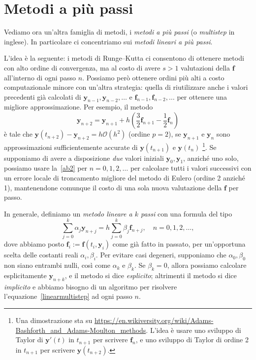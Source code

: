 \documentclass[a4paper]{report}
\theoremstyle{definiton}
\theoremstyle{remark}
\newcommand{\y}{\mathbf{y}}
\newcommand{\f}{\mathbf{f}}
\begin{document}
\section{Metodi a più passi}

Vediamo ora un'altra famiglia di metodi, i \emph{metodi a più passi} (o \emph{multistep} in inglese). In particolare ci concentriamo sui \emph{metodi lineari a più passi}.

L'idea è la seguente: i metodi di Runge--Kutta ci consentono di ottenere metodi con alto ordine di convergenza, ma al costo di avere $s>1$ valutazioni della $\mathbf{f}$ all'interno di ogni passo $n$. Possiamo però ottenere ordini più alti a costo computazionale minore con un'altra strategia: quella di riutilizzare anche i valori precedenti già calcolati di $\y_{n-1}, \y_{n-2}, \dots$ e $\f_{n-1},\f_{n-2},\dots$ per ottenere una migliore approssimazione. Per esempio, il metodo
\begin{equation} \label{ab2}
    \y_{n+2} = \y_{n+1} + h\left(\frac32 \f_{n+1} - \frac12 \f_n\right)    
\end{equation}
è tale che $\y(t_{n+2}) - \y_{n+2} = h\mathcal{O}(h^2)$ (ordine $p=2$), se $\y_{n+1}$ e $\y_n$ sono approssimazioni sufficientemente accurate di $\y(t_{n+1})$ e $\y(t_n)$ \footnote{Una dimostrazione sta su \url{https://en.wikiversity.org/wiki/Adams-Bashforth_and_Adams-Moulton_methods}. L'idea è usare uno sviluppo di Taylor di $\y'(t)$ in $t_{n+1}$ per scrivere $\f_n$, e uno sviluppo di Taylor di ordine 2 in $t_{n+1}$ per scrivere $\y(t_{n+2})$.}. Se supponiamo di avere a disposizione \emph{due} valori iniziali $\y_0, \y_1$, anziché uno solo, possiamo usare la~\eqref{ab2} per $n=0,1,2,\dots$ per calcolare tutti i valori successivi con un errore locale di troncamento migliore del metodo di Eulero (ordine 2 anziché 1), mantenendone comunque il costo di una sola nuova valutazione della $\f$ per passo.

In generale, definiamo un \emph{metodo lineare a $k$ passi} con una formula del tipo
\begin{equation} \label{linearmultistep}
    \sum_{j=0}^k \alpha_j \y_{n+j} = h\sum_{j=0}^k \beta_j \f_{n+j}, \quad n=0,1,2,\dots,    
\end{equation}
dove abbiamo posto $\f_i := \f(t_i, \y_i)$ come già fatto in passato, per un'opportuna scelta delle costanti reali $\alpha_i, \beta_i$. Per evitare casi degeneri, supponiamo che $\alpha_0,\beta_0$ non siano entrambi nulli, così come $\alpha_k$ e $\beta_k$. Se $\beta_k=0$, allora possiamo calcolare esplicitamente $\y_{n+k}$, e il metodo si dice \emph{esplicito}; altrimenti il metodo si dice \emph{implicito} e abbiamo bisogno di un algoritmo per risolvere l'equazione~\eqref{linearmultistep} ad ogni passo $n$.
\end{document}

